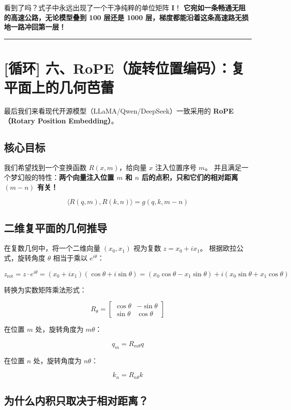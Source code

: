 看到了吗？式子中永远出现了一个干净纯粹的单位矩阵 $\mathbf{I}$！
\textbf{它宛如一条畅通无阻的高速公路，无论模型叠到 100 层还是 1000 层，梯度都能沿着这条高速路无损地一路冲回第一层！}

\vspace{0.8em}\hrule\vspace{0.8em}

\section{[循环] 六、RoPE（旋转位置编码）：复平面上的几何芭蕾}

最后我们来看现代开源模型（LLaMA/Qwen/DeepSeek）一致采用的 \textbf{RoPE（Rotary Position Embedding）}。

\subsection{核心目标}

我们希望找到一个变换函数 $R(x, m)$，给向量 $x$ 注入位置序号 $m$。
并且满足一个梦幻般的特性：\textbf{两个向量注入位置 $m$ 和 $n$ 后的点积，只和它们的相对距离 $(m - n)$ 有关！}

\[
\langle R(q, m), R(k, n) \rangle = g(q, k, m - n)
\]

\subsection{二维复平面的几何推导}

在复数几何中，将一个二维向量 $(x_0, x_1)$ 视为复数 $z = x_0 + i x_1$。
根据欧拉公式，旋转角度 $\theta$ 相当于乘以 $e^{i \theta}$：

\[
z_{\text{rot}} = z \cdot e^{i \theta} = (x_0 + i x_1)(\cos\theta + i\sin\theta) = (x_0\cos\theta - x_1\sin\theta) + i(x_0\sin\theta + x_1\cos\theta)
\]

转换为实数矩阵乘法形式：

\[
R_{\theta} = \begin{bmatrix}
\cos\theta & -\sin\theta \\
\sin\theta & \cos\theta
\end{bmatrix}
\]

在位置 $m$ 处，旋转角度为 $m \theta$：

\[
q_m = R_{m \theta} q
\]

在位置 $n$ 处，旋转角度为 $n \theta$：

\[
k_n = R_{n \theta} k
\]

\subsection{为什么内积只取决于相对距离？}

